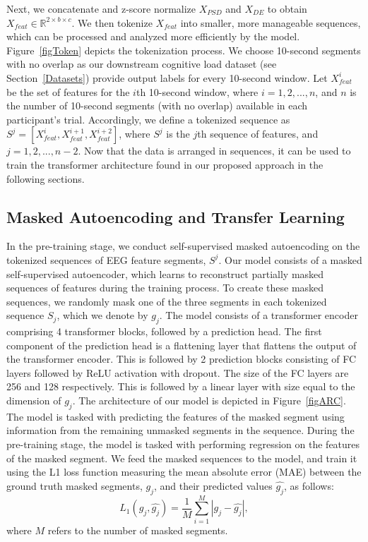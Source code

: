 \documentclass[sigconf]{acmart}
\begin{document}
Next, we concatenate and z-score normalize $X_{PSD}$ and $X_{DE}$ to obtain $X_{feat} \in \mathbb{R}^{2 \times b \times c}$. We then tokenize $X_{feat}$ into smaller, more manageable sequences, which can be processed and analyzed more efficiently by the model. Figure~\ref{figToken} depicts the tokenization process. We choose 10-second segments with no overlap as our downstream cognitive load dataset (see Section~\ref{Datasets}) provide output labels for every 10-second window. Let $X^{i}_{feat}$ be the set of features for the $i$th 10-second window, where $i = 1, 2, ..., n$, and $n$ is the number of 10-second segments (with no overlap) available in each participant's trial. Accordingly, we define a tokenized sequence as $S^j = [X^{i}_{feat}, X^{i+1}_{feat}, X^{i+2}_{feat}]$, where $S^{j}$ is the $j$th sequence of features, and $j= 1, 2, ..., n-2$. Now that the data is arranged in sequences, it can be used to train the transformer architecture found in our proposed approach in the following sections.

\subsection{Masked Autoencoding and Transfer Learning}
In the pre-training stage, we conduct self-supervised masked autoencoding on the tokenized sequences of EEG feature segments, $S^j$. Our model consists of a masked self-supervised autoencoder,  which learns to reconstruct partially masked sequences of features during the training process. To create these masked sequences, we randomly mask one of the three segments in each tokenized sequence $S_j$, which we denote by $g_j$. 
The model consists of a transformer encoder comprising 4 transformer blocks, followed by a prediction head. The first component of the prediction head is a flattening layer that flattens the output of the transformer encoder. This is followed by 2 prediction blocks consisting of FC layers followed by ReLU activation with dropout. The size of the FC layers are 256 and 128 respectively. This is followed by a linear layer with size equal to the dimension of $g_j$. The architecture of our model is depicted in Figure~\ref{figARC}. The model is tasked with predicting the features of the masked segment using information from the remaining unmasked segments in the sequence. During the pre-training stage, the model is tasked with performing regression on the features of the masked segment. We feed the masked sequences to the model, and train it using the L1 loss function measuring the mean absolute error (MAE) between the ground truth masked segments, $g_j$, and their predicted values $\hat{g_j}$, as follows:
\begin{equation}\label{L1}
L_{1}(g_j, \hat{g_j}) = \frac{1}{M} \sum_{i=1}^{M} | g_j - \hat{g_j} |,
\end{equation}
where $M$ refers to the number of masked segments. 
\end{document}
